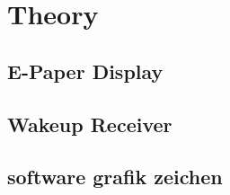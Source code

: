 \chapter{Theory}

\section{E-Paper Display}


\section{Wakeup Receiver}


\section{software grafik zeichen}
